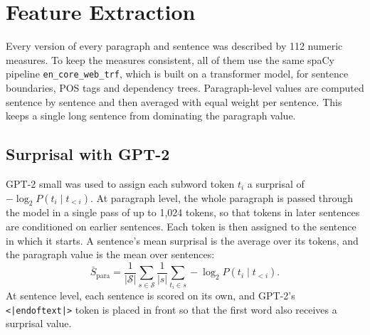 \documentclass[12pt,a4paper,oneside]{report}
\newcommand{\feat}[1]{\texttt{\detokenize{#1}}}
\begin{document}
\section{Feature Extraction}
\label{sec:features}
Every version of every paragraph and sentence was described by 112 numeric measures. To keep the measures consistent, all of them use the same spaCy pipeline \texttt{en\_core\_web\_trf}, which is built on a transformer model, for sentence boundaries, POS tags and dependency trees. Paragraph-level values are computed sentence by sentence and then averaged with equal weight per sentence. This keeps a single long sentence from dominating the paragraph value.

\subsection{Surprisal with GPT-2}
GPT-2 small \citep{radford2019} was used to assign each subword token $t_i$ a surprisal of $-\log_2 P(t_i \mid t_{<i})$. At paragraph level, the whole paragraph is passed through the model in a single pass of up to 1{,}024 tokens, so that tokens in later sentences are conditioned on earlier sentences. Each token is then assigned to the sentence in which it starts. A sentence's mean surprisal is the average over its tokens, and the paragraph value \feat{mean_surprisal} is the mean over sentences:
\begin{equation}
  \bar S_{\text{para}} = \frac{1}{|\mathcal{S}|} \sum_{s \in \mathcal{S}} \frac{1}{|s|} \sum_{t_i \in s} -\log_2 P(t_i \mid t_{<i}).
\end{equation}
At sentence level, each sentence is scored on its own, and GPT-2's \texttt{<|endoftext|>} token is placed in front so that the first word also receives a surprisal value.
\end{document}
